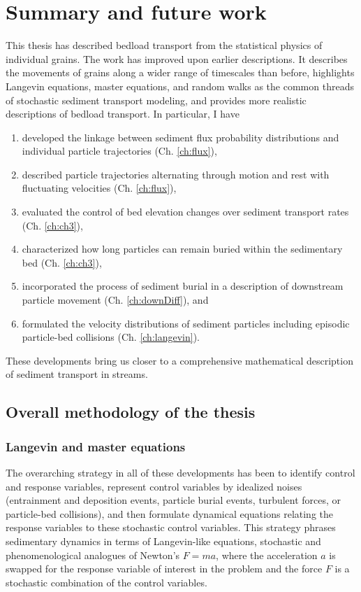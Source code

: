 
\chapter{Summary and future work}
\label{ch:conc}

This thesis has described bedload transport from the statistical physics of individual grains.
The work has improved upon earlier descriptions.
It describes the movements of grains along a wider range of timescales than before, highlights Langevin equations, master equations, and random walks as the common threads of stochastic sediment transport modeling, and provides more realistic descriptions of bedload transport. In particular, I have
\begin{enumerate}
	\item developed the linkage between sediment flux probability distributions and individual particle trajectories (Ch. \ref{ch:flux}), 
	\item described particle trajectories alternating through motion and rest with fluctuating velocities (Ch. \ref{ch:flux}),
	\item evaluated the control of bed elevation changes over sediment transport rates (Ch. \ref{ch:ch3}),
	\item characterized how long particles can remain buried within the sedimentary bed (Ch. \ref{ch:ch3}),
	\item incorporated the process of sediment burial in a description of downstream particle movement (Ch. \ref{ch:downDiff}), and
	\item formulated the velocity distributions of sediment particles including episodic particle-bed collisions (Ch. \ref{ch:langevin}).
\end{enumerate}
These developments bring us closer to a comprehensive mathematical description of sediment transport in streams.

\section{Overall methodology of the thesis}

\subsection{Langevin and master equations}

The overarching strategy in all of these developments has been to identify control and response variables, represent control variables by idealized noises (entrainment and deposition events, particle burial events, turbulent forces, or particle-bed collisions), and then formulate dynamical equations relating the response variables to these stochastic control variables.
This strategy phrases sedimentary dynamics in terms of Langevin-like equations, stochastic and phenomenological analogues of Newton's $F=ma$, where the acceleration $a$ is swapped for the response variable of interest in the problem and the force $F$ is a stochastic combination of the control variables. 

